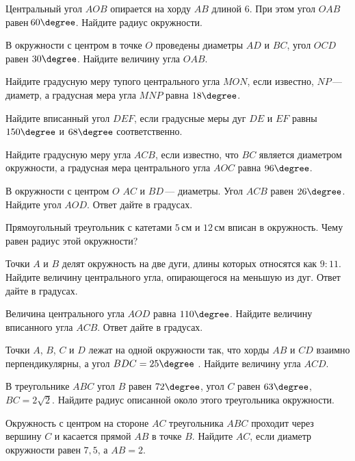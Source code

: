 \begin{class}[number=5]
	\begin{listofex}
		\item Центральный угол \( AOB \) опирается на хорду \( AB \) длиной \( 6 \). При этом угол \( OAB \) равен \( 60\degree \). Найдите радиус окружности.
		\item В окружности с центром в точке \( O \) проведены диаметры \( AD \) и \( BC \), угол \( OCD \) равен \( 30\degree \). Найдите величину угла \( OAB \).
		\item Найдите градусную меру тупого центрального угла \( MON \), если известно, \( NP \) --- диаметр, а градусная мера угла \( MNP \) равна \( 18\degree \).
		\item Найдите вписанный угол \( DEF \), если градусные меры дуг \( DE \) и \( EF \) равны \( 150\degree \) и \( 68\degree \) соответственно.
		\item Найдите градусную меру угла \( ACB \), если известно, что \( BC \) является диаметром окружности, а градусная мера центрального угла \( AOC \) равна \( 96\degree \).
		\item В окружности с центром \( O \) \( AC \) и \( BD \) --- диаметры. Угол \( ACB \) равен \( 26\degree \). Найдите угол \( AOD \). Ответ дайте в градусах.
		\item Прямоугольный треугольник с катетами \( 5 \) см и \( 12 \) см вписан в окружность. Чему равен радиус этой окружности?
		\item Точки \( A \) и \( B \) делят окружность на две дуги, длины которых относятся как \( 9:11 \). Найдите величину центрального угла, опирающегося на меньшую из дуг. Ответ дайте в градусах.
		\item Величина центрального угла \( AOD \) равна \( 110\degree \). Найдите величину вписанного угла \( ACB \). Ответ дайте в градусах.
		\item Точки \( A \), \( B \), \( C \) и \( D \) лежат на одной окружности так, что хорды \( AB \) и \( CD \) взаимно перпендикулярны, а угол \( BDC=25\degree \) . Найдите величину угла \( ACD \).
		\item В треугольнике \( ABC \) угол \( B \) равен \( 72\degree \), угол \( C \) равен \( 63\degree \), \( BC=2\sqrt{2} \). Найдите радиус описанной около этого треугольника окружности.
		\item Окружность с центром на стороне \( AC \) треугольника \( ABC \) проходит через вершину \( C \) и касается прямой \( AB \) в точке \( B \). Найдите \( AC \), если диаметр окружности равен \( 7,5 \), а \( AB=2 \).

\end{listofex}
\end{class}
